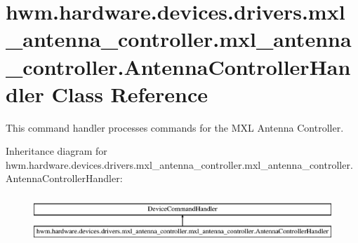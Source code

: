 \hypertarget{classhwm_1_1hardware_1_1devices_1_1drivers_1_1mxl__antenna__controller_1_1mxl__antenna__controll042461b90848f732dc4817f26065c532}{\section{hwm.\-hardware.\-devices.\-drivers.\-mxl\-\_\-antenna\-\_\-controller.\-mxl\-\_\-antenna\-\_\-controller.\-Antenna\-Controller\-Handler Class Reference}
\label{classhwm_1_1hardware_1_1devices_1_1drivers_1_1mxl__antenna__controller_1_1mxl__antenna__controll042461b90848f732dc4817f26065c532}
}


This command handler processes commands for the M\-X\-L Antenna Controller.  


Inheritance diagram for hwm.\-hardware.\-devices.\-drivers.\-mxl\-\_\-antenna\-\_\-controller.\-mxl\-\_\-antenna\-\_\-controller.\-Antenna\-Controller\-Handler\-:\begin{figure}[H]
\begin{center}
\leavevmode
\includegraphics[height=1.815235cm]{classhwm_1_1hardware_1_1devices_1_1drivers_1_1mxl__antenna__controller_1_1mxl__antenna__controll042461b90848f732dc4817f26065c532}
\end{center}
\end{figure}
